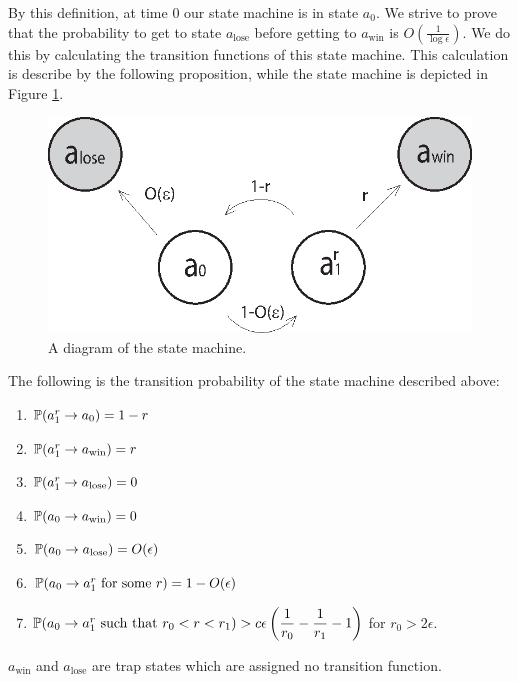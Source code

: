 {By this definition, at time $0$ our state machine is in state $a_0$.
We strive to prove that the probability to get to
 state $a_\text{lose}$ before getting to $a_\text{win}$ is $O(\frac1{\log\epsilon})$.
 We do this by calculating the transition functions of
 this state machine. This calculation is describe by the following proposition,
 while the state machine is depicted in Figure \ref{fig:state_machine}.

 \begin{figure}[htb]
\begin{center}
\leavevmode
\includegraphics{state_machine.eps}
\end{center}
\caption{A diagram of the state machine.}
\label{fig:state_machine}
\end{figure}

\begin{propos}\label{prop:trans}
The following is the transition probability of the state machine described above:
\begin{enumerate}
\item\label{m11} $\P(a^r_1\rightarrow a_0)=1-r$
\item\label{m12} $\P(a^r_1\rightarrow a_\text{win})=r$
\item\label{m13} $\P(a^r_1\rightarrow a_\text{lose})=0$
\item\label{m21} $\P(a_0\rightarrow a_\text{win})=0$
\item\label{m22} $\P(a_0\rightarrow a_\text{lose})=O(\epsilon)$
\item\label{m23} $\P(a_0\rightarrow a^r_1 \text{ for some }r)=1-O(\epsilon)$
\item\label{m24} $\P(a_0\rightarrow a^r_1 \text{ such that } r_0<r<r_1)>\ds c\epsilon\left(\frac 1 {r_0}-\frac 1 {r_1}-1\right)$ for $r_0>2\epsilon$.
\end{enumerate}
$a_\text{win}$ and $a_\text{lose}$ are trap states which are assigned no transition function.
\end{propos}

}

